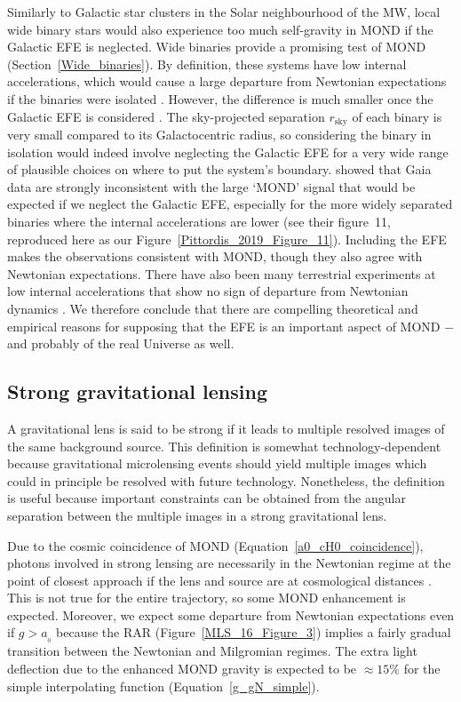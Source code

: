 \documentclass[fleqn,usenatbib,useAMS,onecolumn]{mnras} %
\begin{document}
Similarly to Galactic star clusters in the Solar neighbourhood of the MW, local wide binary stars would also experience too much self-gravity in MOND if the Galactic EFE is neglected. Wide binaries provide a promising test of MOND (Section~\ref{Wide_binaries}). By definition, these systems have low internal accelerations, which would cause a large departure from Newtonian expectations if the binaries were isolated \citep{Hernandez_2012}. However, the difference is much smaller once the Galactic EFE is considered \citep{Banik_2018_Centauri}. The sky-projected separation $r_{\text{sky}}$ of each binary is very small compared to its Galactocentric radius, so considering the binary in isolation would indeed involve neglecting the Galactic EFE for a very wide range of plausible choices on where to put the system's boundary. \citet{Pittordis_2019} showed that Gaia data are strongly inconsistent with the large `MOND' signal that would be expected if we neglect the Galactic EFE, especially for the more widely separated binaries where the internal accelerations are lower (see their figure~11, reproduced here as our Figure~\ref{Pittordis_2019_Figure_11}). Including the EFE makes the observations consistent with MOND, though they also agree with Newtonian expectations. There have also been many terrestrial experiments at low internal accelerations that show no sign of departure from Newtonian dynamics \citep{Gundlach_2007}. We therefore conclude that there are compelling theoretical and empirical reasons for supposing that the EFE is an important aspect of MOND $-$ and probably of the real Universe as well.



\subsection{Strong gravitational lensing}
\label{Strong_lensing}

A gravitational lens is said to be strong if it leads to multiple resolved images of the same background source. This definition is somewhat technology-dependent because gravitational microlensing events \citep{Refsdal_1966} should yield multiple images which could in principle be resolved with future technology. Nonetheless, the definition is useful because important constraints can be obtained from the angular separation between the multiple images in a strong gravitational lens.

Due to the cosmic coincidence of MOND (Equation~\ref{a0_cH0_coincidence}), photons involved in strong lensing are necessarily in the Newtonian regime at the point of closest approach if the lens and source are at cosmological distances \citep{Sanders_2014}. This is not true for the entire trajectory, so some MOND enhancement is expected. Moreover, we expect some departure from Newtonian expectations even if $g > a_{_0}$ because the RAR (Figure~\ref{MLS_16_Figure_3}) implies a fairly gradual transition between the Newtonian and Milgromian regimes. The extra light deflection due to the enhanced MOND gravity is expected to be $\approx 15\%$ for the simple interpolating function (Equation~\ref{g_gN_simple}).
\end{document}
